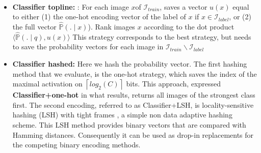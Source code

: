 \documentclass{article}
\begin{document}
\\
\begin{itemize}

\item \textbf{Classifier topline: }: For each image $x$of $\mathcal{I}_{train}$, saves a vector $u(x)$ equal to either (1) the one-hot encoding vector of the label of $x$ if $x \in \mathcal{I}_{label}$, or (2) the full  vector  $\hat{\mathbb{P}}(.\mid x)$). Rank images $x$ according to the dot product $\langle\hat{\mathbb{P}}(.\mid q), u(x)\rangle$  This strategy corresponds to the best strategy, but needs to save the probability vectors for each image in $\mathcal{I}_{train} \backslash \mathcal{I}_{label}$


\item \textbf{Classifier hashed: } Here we hash the probability vector. The first hashing method that we evaluate, is the one-hot strategy, which saves the index of the maximal activation on $\left \lceil log_2(C) \right \rceil$ bits. This approach, expressed \textbf{Classifier+one-hot} in what results, returns all images of the strongest class first. The second encoding, referred to as Classifier+LSH, is locality-sensitive hashing (LSH) with tight frames \cite{jegou2012anti}, a simple non data adaptive hashing scheme. This LSH method provides binary vectors that are compared with Hamming distances. Consequently it can be used as drop-in replacements for the competing binary encoding methods.
\end{itemize}
\end{document}
